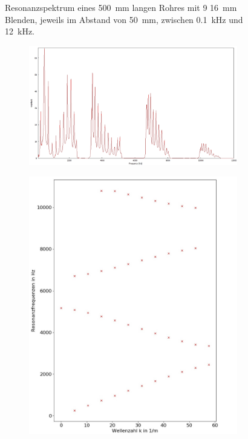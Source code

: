 \begin{figure}
\begin{subfigure}{0.34\textwidth}
\end{subfigure}
\caption{Resonanzspektrum eines 500~mm langen Rohres mit 9 16~mm Blenden, jeweils im Abstand von 50~mm, zwischen 0.1~kHz und 12~kHz.}
\label{fig:4_4_10}
\end{figure}
\begin{figure}
\centering
\begin{subfigure}{0.65\textwidth}
\includegraphics[width=\textwidth]{content/messungen/Chapter4/4_4_12x50.jpg}
\end{subfigure}
\begin{subfigure}{0.34\textwidth}
\includegraphics[width=\textwidth]{content/Scripts/4_4_12_red.jpg}

\end{subfigure}
\end{figure}
